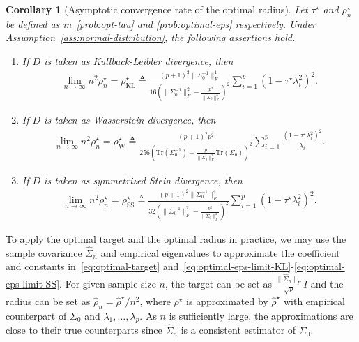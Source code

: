 \documentclass[11pt]{article}
\newtheorem{corollary}{Corollary}
\newcommand{\opt}{^\star}
\newcommand{\Let}{\triangleq}
\def\tr{\mathrm{Tr}}
\newcommand{\wh}{\widehat}
\begin{document}
\begin{corollary}[Asymptotic convergence rate of the optimal radius]\label{coro:optimal-radius}
    Let $\tau\opt$ and $\rho_n\opt$ be defined as in~\eqref{prob:opt-tau} and \eqref{prob:optimal-eps}  respectively.
    Under Assumption~\ref{ass:normal-distribution}, the following assertions hold.
    \begin{enumerate}[label=(\roman*)]
        \item If $D$ is taken as Kullback-Leibler divergence, then 
        \begin{align}\label{eq:optimal-eps-limit-KL}
            \lim_{n\to\infty} n^2  \rho_n\opt =  \rho_{\text{KL}}\opt\Let\frac{(p+1)^2\|\Sigma_0^{-1}\|_F^4}{16\left(\|\Sigma_0^{-1}\|_F^2-\frac{p^2}{\|\Sigma_0\|_F^2}\right)^2}\sum_{i=1}^p \left(1-\tau\opt \lambda_i^2\right)^2.
        \end{align}
        \item If $D$ is taken as Wasserstein divergence, then 
        \begin{align}\label{eq:optimal-eps-limit-W}
            \lim_{n\to\infty} n^2  \rho_n\opt =  \rho_{\text{W}}\opt\Let\frac{(p+1)^2p^2}{256\left(\tr(\Sigma_0^{-1}) - \frac{p}{\|\Sigma_0\|_F^2}\tr(\Sigma_0)\right)^2}\sum_{i=1}^p \frac{(1-\tau\opt \lambda_i^2)^2}{\lambda_i}.
        \end{align}
        \item If $D$ is taken as symmetrized Stein divergence, then 
        \begin{align}\label{eq:optimal-eps-limit-SS}
            \lim_{n\to\infty} n^2  \rho_n\opt =  \rho_{\text{SS}}\opt\Let\frac{(p+1)^2\|\Sigma_0^{-1}\|_F^4}{32\left(\|\Sigma_0^{-1}\|_F^2-\frac{p^2}{\|\Sigma_0\|_F^2}\right)^2}\sum_{i=1}^p \left(1-\tau\opt \lambda_i^2\right)^2.
        \end{align}
    \end{enumerate}
\end{corollary}
To apply the optimal target and the optimal radius in practice, we may use the sample covariance $\wh\Sigma_n$ and empirical eigenvalues to approximate the coefficient and constants in~\eqref{eq:optimal-target} and~\eqref{eq:optimal-eps-limit-KL}-\eqref{eq:optimal-eps-limit-SS}. For given sample size $n$, the target can be set as $\frac{\|\wh\Sigma_n\|_F}{\sqrt{p}}I$ and  the radius can be set as $\wh\rho_n=\wh{ \rho}\opt/n^2$, where ${\rho}\opt$ is approximated by $\wh{\rho}\opt$ with empirical counterpart of $\Sigma_0$ and $\lambda_1,\ldots,\lambda_p$. As $n$ is sufficiently large, 
the approximations are close to their true counterparts since $\wh\Sigma_n$ is a consistent estimator of $\Sigma_0$.
\end{document}
